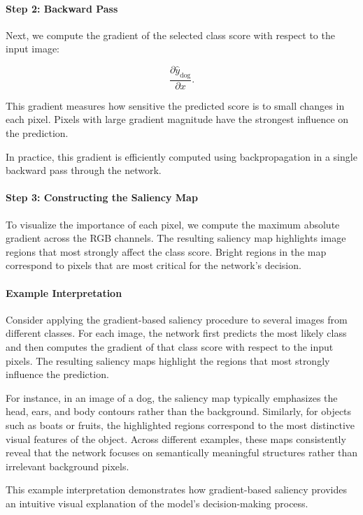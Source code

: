 \documentclass{article}
\begin{document}
\paragraph{Step 2: Backward Pass}

Next, we compute the gradient of the selected class score with respect to the input image:

\[
\frac{\partial \hat{y}_{\text{dog}}}{\partial x}.
\]

This gradient measures how sensitive the predicted score is to small changes in each pixel. Pixels with large gradient magnitude have the strongest influence on the prediction.

In practice, this gradient is efficiently computed using backpropagation in a single backward pass through the network.

\paragraph{Step 3: Constructing the Saliency Map}

To visualize the importance of each pixel, we compute the maximum absolute gradient across the RGB channels. The resulting saliency map highlights image regions that most strongly affect the class score. Bright regions in the map correspond to pixels that are most critical for the network’s decision.

\paragraph{Example Interpretation}

Consider applying the gradient-based saliency procedure to several images from different classes. For each image, the network first predicts the most likely class and then computes the gradient of that class score with respect to the input pixels. The resulting saliency maps highlight the regions that most strongly influence the prediction.

For instance, in an image of a dog, the saliency map typically emphasizes the head, ears, and body contours rather than the background. Similarly, for objects such as boats or fruits, the highlighted regions correspond to the most distinctive visual features of the object. Across different examples, these maps consistently reveal that the network focuses on semantically meaningful structures rather than irrelevant background pixels.

This example interpretation demonstrates how gradient-based saliency provides an intuitive visual explanation of the model’s decision-making process.
\end{document}
